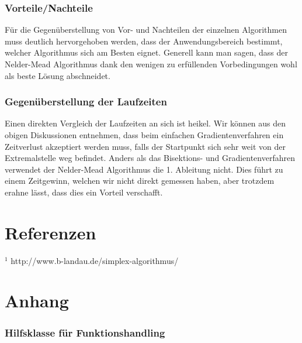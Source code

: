 \documentclass[10pt]{article}         %
\begin{document}
\subsubsection{Vorteile/Nachteile}
Für die Gegenüberstellung von Vor- und Nachteilen der einzelnen Algorithmen muss deutlich hervorgehoben werden, dass der Anwendungsbereich bestimmt, welcher Algorithmus sich am Besten eignet. Generell kann man sagen, dass der Nelder-Mead Algorithmus dank den wenigen zu erfüllenden Vorbedingungen wohl als beste Lösung abschneidet. 
\subsubsection{Gegenüberstellung der Laufzeiten}
Einen direkten Vergleich der Laufzeiten an sich ist heikel. Wir können aus den obigen Diskussionen entnehmen, dass beim einfachen Gradientenverfahren ein Zeitverlust akzeptiert werden muss, falls der Startpunkt sich sehr weit von der Extremalstelle weg befindet. Anders als das Bisektions- und Gradientenverfahren verwendet der Nelder-Mead Algorithmus die 1. Ableitung nicht. Dies führt zu einem Zeitgewinn, welchen wir nicht direkt gemessen haben, aber trotzdem erahne lässt, dass dies ein Vorteil verschafft.

\section{Referenzen}
\begin{list}{}{}
\item $^1$ http://www.b-landau.de/simplex-algorithmus/
\end{list}

\pagebreak
\section{Anhang}


\subsubsection{Hilfsklasse für Funktionshandling}

\end{document}
